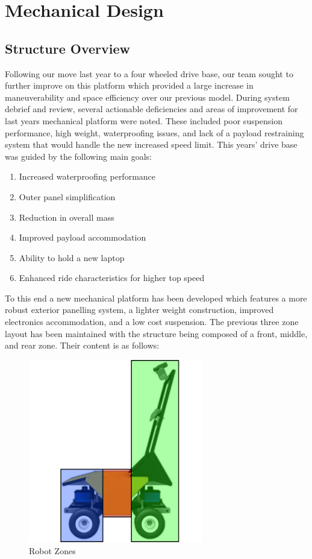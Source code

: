 \section{Mechanical Design}

\subsection{Structure Overview}
Following our move last year to a four wheeled drive base, our team sought to further improve on this platform which provided a large increase in maneuverability and space efficiency over our previous model. During system debrief and review, several actionable deficiencies and areas of improvement for last years mechanical platform were noted. These included poor suspension performance, high weight, waterproofing issues, and lack of a payload restraining system that would handle the new increased speed limit. This years' drive base was guided by the following main goals:

\begin{enumerate}
\item Increased waterproofing performance
\item Outer panel simplification
\item Reduction in overall mass
\item Improved payload accommodation
\item Ability to hold a new laptop
\item Enhanced ride characteristics for higher top speed
\end{enumerate}

To this end a new mechanical platform has been developed which features a more robust exterior panelling system, a lighter weight construction, improved electronics accommodation, and a low cost suspension. The previous three zone layout has been maintained with the structure being composed of a front, middle, and rear zone. Their content is as follows:

\begin{figure}[H]
\begin{center}
\includegraphics[width=3in]{./pics/RobotZones.png}
\caption{Robot Zones}
\label{FIG:Zones}
\end{center}
\end{figure}

